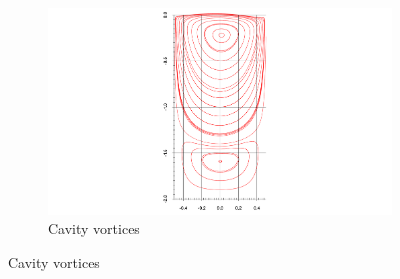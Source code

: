 \documentclass[twocolumn,10pt]{asme2ej}
\begin{document}
\nocite{*}



\clearpage
\begin{figure}[tbh]
        \centering
        \begin{subfigure}[b]{0.5\textwidth}
                \includegraphics[width=\textwidth]{figure/AR2-Re100 streamFunction axis final.pdf}
                \caption{Cavity vortices}
                \label{AR2RE100_cavity}
        \end{subfigure}%
        \label{AR2RE100}


\end{figure}
\end{document}
